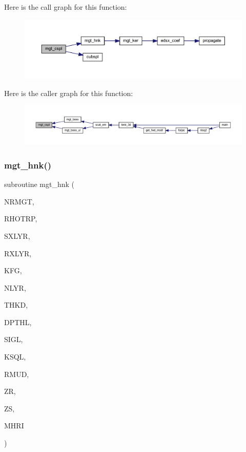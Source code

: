 Here is the call graph for this function\+:\nopagebreak
\begin{figure}[H]
\begin{center}
\leavevmode
\includegraphics[width=350pt]{Leroi_8f90_afd2db4ed971ee6e92ca6da7bece2caff_cgraph}
\end{center}
\end{figure}
Here is the caller graph for this function\+:\nopagebreak
\begin{figure}[H]
\begin{center}
\leavevmode
\includegraphics[width=350pt]{Leroi_8f90_afd2db4ed971ee6e92ca6da7bece2caff_icgraph}
\end{center}
\end{figure}
\mbox{\label{Leroi_8f90_a8765868cf7e593af1ecbeadd492b6b49}} 
\subsubsection{\texorpdfstring{mgt\+\_\+hnk()}{mgt\_hnk()}}
{\footnotesize\ttfamily subroutine mgt\+\_\+hnk (\begin{DoxyParamCaption}\item[{integer}]{N\+R\+M\+GT,  }\item[{real, dimension(nrmgt)}]{R\+H\+O\+T\+RP,  }\item[{integer}]{S\+X\+L\+YR,  }\item[{integer}]{R\+X\+L\+YR,  }\item[{integer}]{K\+FG,  }\item[{integer}]{N\+L\+YR,  }\item[{real (kind=ql), dimension(nlyr)}]{T\+H\+KD,  }\item[{real (kind=ql), dimension(nlyr)}]{D\+P\+T\+HL,  }\item[{complex (kind=ql), dimension(nlyr)}]{S\+I\+GL,  }\item[{complex (kind=ql), dimension(nlyr)}]{K\+S\+QL,  }\item[{real (kind=ql), dimension(0\+:nlyr)}]{R\+M\+UD,  }\item[{real (kind=ql)}]{ZR,  }\item[{real (kind=ql)}]{ZS,  }\item[{complex (kind=ql), dimension(nrmgt,5)}]{M\+H\+RI }\end{DoxyParamCaption})}

